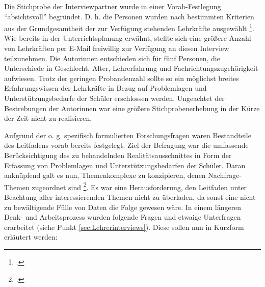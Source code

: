 Die Stichprobe der Interviewpartner wurde in einer Vorab-Festlegung "`absichtsvoll"' begründet. D. h. die Personen wurden nach bestimmten Kriterien aus der Grundgesamtheit der zur Verfügung stehenden Lehrkräfte ausgewählt \footcite[vgl.][39]{Mayer2013}. Wie bereits in der Unterrichtsplanung erwähnt, stellte sich eine größere Anzahl von Lehrkräften per E-Mail freiwillig zur Verfügung an diesen Interview teilzunehmen. Die Autorinnen entschieden sich für fünf Personen, die Unterschiede in Geschlecht, Alter, Lehrerfahrung und Fachrichtungszugehörigkeit aufwiesen. Trotz der geringen Probandenzahl sollte so ein möglichst breites Erfahrungswissen der Lehrkräfte in Bezug auf Problemlagen und Unterstützungsbedarfe der Schüler erschlossen werden. Ungeachtet der Bestrebungen der Autorinnen war eine größere Stichprobenerhebung in der Kürze der Zeit nicht zu realisieren.

Aufgrund der o. g. spezifisch formulierten Forschungsfragen waren Bestandteile des Leitfadens vorab bereits festgelegt. Ziel der Befragung war die umfassende Berücksichtigung des zu behandelnden Realitätsausschnittes in Form der Erfassung von Problemlagen und Unterstützungsbedarfen der Schüler. Daran anknüpfend galt es nun, Themenkomplexe zu konzipieren, denen Nachfrage-Themen zugeordnet sind \footcite[vgl.][45]{Mayer2013}. Es war eine Herausforderung, den Leitfaden unter Beachtung aller interessierenden Themen nicht zu überladen, da sonst eine nicht zu bewältigende Fülle von Daten die Folge gewesen wäre. In einem längeren Denk- und Arbeitsprozess wurden folgende Fragen und etwaige Unterfragen erarbeitet (siehe Punkt \ref{sec:Lehrerinterviews}). Diese sollen nun in Kurzform erläutert werden:

